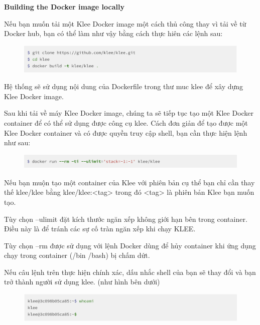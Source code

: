 \documentclass[12pt,a4paper]{article}
\begin{document}
\textbf{Building the Docker image locally}

Nếu bạn muốn tải một Klee Docker image một cách thủ công thay vì tải về từ Docker hub, bạn có thể làm như vậy bằng cách thực hiên các lệnh sau:

\begin{figure}[ht]
\begin{center}
\includegraphics[scale=.3]{hinhanh/builddockerlocal.png}
\end{center}
\end{figure}

Hệ thống sẽ sử dụng nội dung của Dockerfile trong thư muc klee để xây dựng Klee Docker image.

Sau khi tải về máy Klee Docker image, chúng ta sẽ tiếp tục tạo một Klee Docker container để có thể  sử dụng được công cụ klee. Cách đơn giản để tạo được một Klee Docker container và có được quyền truy cập shell, bạn cần thực hiện lệnh như sau:

\begin{figure}[ht]
\begin{center}
\includegraphics[scale=.3]{hinhanh/kleecontainer.png}
\end{center}
\end{figure}

Nếu bạn muộn tạo một container của Klee với phiên bản cụ thể bạn chỉ cần thay thế klee/klee bằng klee/klee:<tag> trong đó <tag> là phiên bản Klee bạn muốn tạo.

Tùy chọn --ulimit đặt kích thước ngăn xếp không giới hạn bên trong container. Điều này là để tránh các sự cố tràn ngăn xếp khi chạy KLEE.

Tùy chọn --rm được sử dụng với lệnh Docker dùng để hủy container khi ứng dụng chạy trong container (/bin /bash) bị chấm dứt. 

Nếu câu lệnh trên thực hiện chính xác, dấu nhắc shell của bạn sẽ thay đổi và bạn trở thành người sử dụng klee. (như hình bên dưới)

\begin{figure}[ht]
\begin{center}
\includegraphics[scale=.3]{hinhanh/shellcontainerklee.png}
\end{center}
\end{figure}
\end{document}
